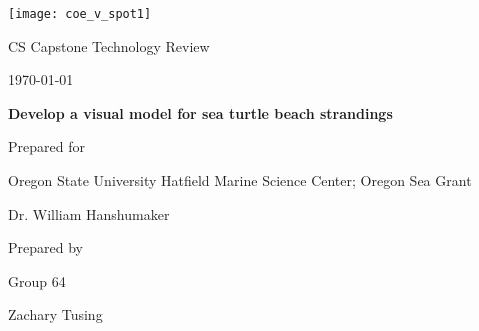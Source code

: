 \documentclass[onecolumn, draftclsnofoot,10pt, compsoc]{IEEEtran}
\def \CapstoneTeamName{     Beached Marine Critters Project Team}
\def \CapstoneTeamNumber{       64}
\def \GroupMemberFive{          Zachary Tusing}
\def \CapstoneProjectName{      Develop a visual model for sea turtle beach strandings}
\def \CapstoneSponsorCompany{   Oregon State University Hatfield Marine Science Center; Oregon Sea Grant}
\def \CapstoneSponsorPerson{        Dr. William Hanshumaker}
\def \DocType{      %
                Technology Review
                }
\newcommand{\NameSigPair}[1]{\par
\makebox[2.75in][r]{#1} \hfil   \makebox[3.25in]{\makebox[2.25in]{\hrulefill} \hfill        \makebox[.75in]{\hrulefill}}
\par\vspace{-12pt} \textit{\tiny\noindent
\makebox[2.75in]{} \hfil        \makebox[3.25in]{\makebox[2.25in][r]{Signature} \hfill  \makebox[.75in][r]{Date}}}}
\renewcommand{\NameSigPair}[1]{#1}
\begin{document}
\begin{titlepage}
    \begin{singlespace}
     \texttt{[image: coe\_v\_spot1]}
        \hfill 
        \par\vspace{.2in}
        \centering
        \scshape{
            \huge CS Capstone \DocType \par
            {\normalsize\today}\par
            \vspace{.5in}
            \textbf{\Huge\CapstoneProjectName}\par
            \vspace{1in}
            {\Large Prepared for}\par
            \huge \CapstoneSponsorCompany\par
            \vspace{5pt}
            {\Large\NameSigPair{\CapstoneSponsorPerson}\par}
            \vspace{.5in}
            {\large Prepared by }\par
            Group\CapstoneTeamNumber\par
            \vspace{5pt}
            {\Large
            \NameSigPair{\GroupMemberFive}\par
            }
            \vspace{20pt}
        }
        \begin{abstract}
           This document describes the possible technical solutions to the problems of GIS Systems, GUI systems, and programming languages. This is followed by a decision on which of the noted implementation options is suggested.
        \end{abstract}
        \vfill    
    \end{singlespace}
\end{titlepage}
\newpage
\end{document}
